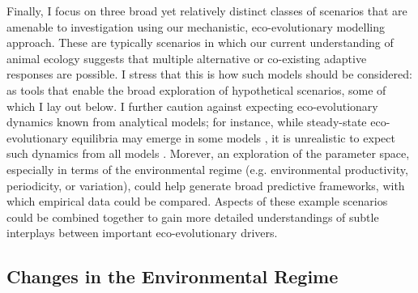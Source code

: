 Finally, I focus on three broad yet relatively distinct classes of scenarios that are amenable to investigation using our mechanistic, eco-evolutionary modelling approach.
These are typically scenarios in which our current understanding of animal ecology suggests that multiple alternative or co-existing adaptive responses are possible.
I stress that this is how such models should be considered: as tools that enable the broad exploration of hypothetical scenarios, some of which I lay out below.
I further caution against expecting eco-evolutionary dynamics known from analytical models; for instance, while steady-state eco-evolutionary equilibria may emerge in some models \parencite[e.g.][]{gupte2021a,gupte2022c,getz2015,getz2016}, it is unrealistic to expect such dynamics from all models \parencite[see e.g.][]{netz2021}.
Morever, an exploration of the parameter space, especially in terms of the environmental regime (e.g. environmental productivity, periodicity, or variation), could help generate broad predictive frameworks, with which empirical data could be compared.
Aspects of these example scenarios could be combined together to gain more detailed understandings of subtle interplays between important eco-evolutionary drivers.

\subsection*{Changes in the Environmental Regime}

